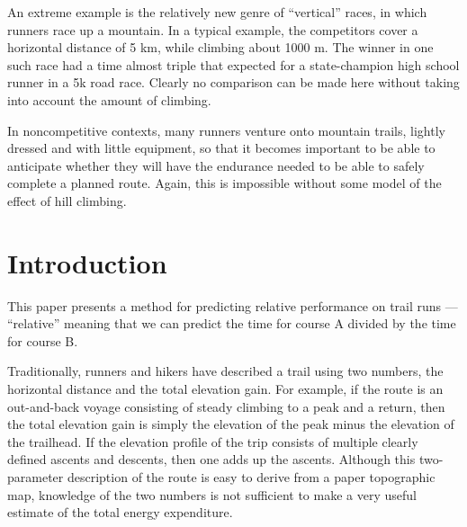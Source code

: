 \documentclass[10pt,letterpaper]{article}
\begin{document}
An extreme example is the relatively new genre
of ``vertical'' races, in which runners race up a mountain.
In a typical example, the competitors cover a horizontal distance of 5 km,
while climbing about 1000 m. The winner in one such race had a time
almost triple that expected for a state-champion high school runner in
a 5k road race. Clearly no comparison can be made here without taking into account
the amount of climbing.

In noncompetitive contexts, many runners venture onto mountain trails,
lightly dressed and with little equipment, so that it becomes important to be able
to anticipate whether they will have the endurance needed to be able to safely complete a planned route.
Again, this is impossible without some model of the effect of hill climbing.



\section{Introduction}

This paper presents a method for predicting relative performance on trail runs --- ``relative''
meaning that we can predict the time for course A divided by the time for course B.

Traditionally, runners and hikers have described a trail using two numbers, the horizontal distance and the total elevation gain.
For example, if the route is an out-and-back voyage consisting of steady climbing to a peak and
a return, then the total elevation gain is simply the elevation of the peak minus the elevation of
the trailhead. If the elevation profile of the trip consists of multiple clearly defined ascents and descents,
then one adds up the ascents. Although this two-parameter description of the route is
easy to derive from a paper topographic map, knowledge of the two numbers is not sufficient
to make a very useful estimate of the total energy expenditure.
\end{document}
